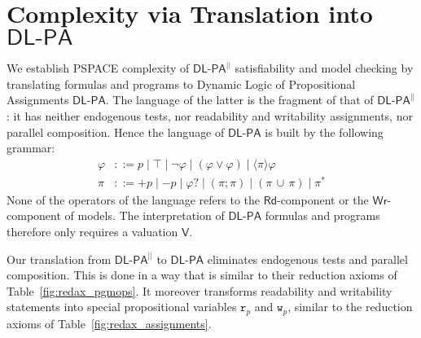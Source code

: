 \documentclass{llncs}
\newcommand{\pll}{ {||} }							%
\newcommand{\readable}[1]{\mathtt{r}_{#1}}
\newcommand{\readset}{\mathsf{Rd}}
\newcommand{\valuset}{\mathsf{V}}
\newcommand{\writable}[1]{\mathtt{w}_{#1}}
\newcommand{\writeset}{\mathsf{Wr}}
\newcommand{\testendo}{?\!\!?}			%
\newcommand{\testpdl}{?}				%
\newcommand{\Dlpa}{\ensuremath{\mathsf{DL\text{-}PA}}\xspace}
\newcommand{\DlpaPll}{\ensuremath{\mathsf{DL\text{-}PA}^\pll}\xspace}
\newcommand{\assgntopR}[1]{{\mathtt r {+} #1}}
\newcommand{\assgnbotR}[1]{{\mathtt r {-} #1}}
\newcommand{\assgntopW}[1]{{\mathtt w {+} #1}}
\newcommand{\assgnbotW}[1]{{\mathtt w {-} #1}}
\newcommand{\assgntopV}[1]{{\mathtt {+} #1}}
\newcommand{\assgnbotV}[1]{{\mathtt {-} #1}}
\newcommand{\ldia}[1]{ \big\langle #1 \big\rangle}
\newcommand{\ndet}{\,{\cup}\,}
\renewcommand{\phi}{\varphi}
\begin{document}
\section{Complexity via Translation into \Dlpa}\label{sec:complexity}

We establish PSPACE complexity of \DlpaPll satisfiability and model checking by translating formulas and programs to 
Dynamic Logic of Propositional Assignments \Dlpa. 
The language of the latter is the fragment of that of \DlpaPll:
it has neither endogenous tests, nor readability and writability assignments, nor parallel composition. 
Hence the language of \Dlpa is built by the following grammar: 
\begin{align*}
\phi & ::= p \mid \top \mid \lnot \phi \mid (\phi \lor \phi) \mid \ldia \pi \phi
\\
\pi & ::= \assgntopV p \mid \assgnbotV p \mid
			\phi \testpdl \mid 
			(\pi ; \pi) \mid (\pi \ndet \pi) \mid 
			\pi^\ast 
\end{align*} 
None of the operators of the language refers to the $\readset$-component or the $\writeset$-component of models. 
The interpretation of \Dlpa formulas and programs therefore only requires a valuation $\valuset$. 

Our translation from \DlpaPll to \Dlpa eliminates endogenous tests and parallel composition. 
This is done in a way that is similar to their reduction axioms of Table~\ref{fig:redax_pgmops}.
It moreover transforms readability and writability statements into special propositional variables $\readable p$ and $\writable p$, similar to the reduction axioms of Table~\ref{fig:redax_assignments}.
\end{document}
